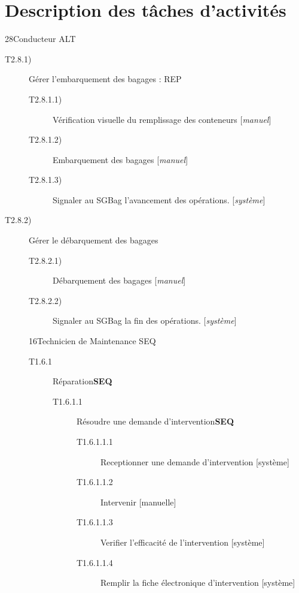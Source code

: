\part{Description des tâches d'activités}

\dta
{2}{8}{Conducteur}
{ALT}
{
\begin{description}
	\item [T2.8.1)] Gérer l'embarquement des bagages : REP
		\begin{description}
			\item [T2.8.1.1)] Vérification visuelle du remplissage des conteneurs [\textsl{manuel}]
			\item [T2.8.1.2)] Embarquement des bagages [\textsl{manuel}]
			\item [T2.8.1.3)] Signaler au SGBag l'avancement des opérations. [\textsl{système}]
		\end{description}

	\item [T2.8.2)] Gérer le débarquement des bagages
		\begin{description}
			\item [T2.8.2.1)] Débarquement des bagages [\textsl{manuel}]
			\item [T2.8.2.2)] Signaler au SGBag la fin des opérations. [\textsl{système}]
		\end{description}

{1}{6}{Technicien de Maintenance}
{SEQ}
{
\begin{description}
	\item[T1.6.1] Réparation\textbf{SEQ}
	\begin{description}
		\item[T1.6.1.1] Résoudre une demande d'intervention\textbf{SEQ}
		\begin{description}
			\item[T1.6.1.1.1] Receptionner une demande d'intervention [système]
			\item[T1.6.1.1.2] Intervenir [manuelle]
			\item[T1.6.1.1.3] Verifier l'efficacité de l'intervention [système]
			\item[T1.6.1.1.4] Remplir la fiche électronique d'intervention [système]
		\end{description}
	\end{description}
\end{description}
}


\end{description}}
